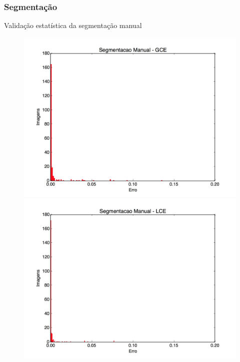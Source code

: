 \documentclass[t]{beamer}
\begin{document}
\begin{frame}
	\frametitle{Segmentação}
	Validação estatística da segmentação manual
	\begin{figure}[h]
		\centering
		\includegraphics[scale=0.10]{imgs/manual_gce}
		\includegraphics[scale=0.10]{imgs/manual_lce}
	\end{figure}
\end{frame}
\end{document}
